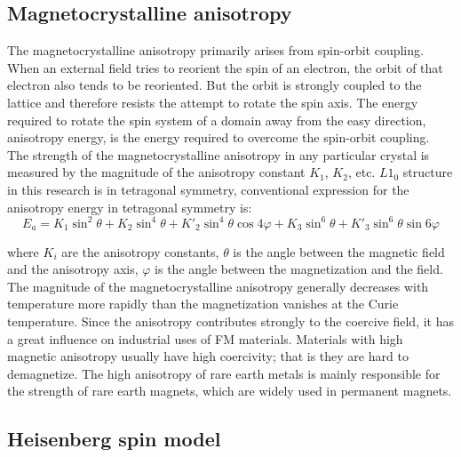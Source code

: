\subsection{Magnetocrystalline anisotropy}
The magnetocrystalline anisotropy primarily arises from spin-orbit coupling.
When an external field tries to reorient the spin of an electron, the orbit of that electron
also tends to be reoriented. But the orbit is strongly coupled to the lattice and therefore
resists the attempt to rotate the spin axis. The energy required to rotate the spin system of
a domain away from the easy direction, anisotropy energy, is the energy required to
overcome the spin-orbit coupling. The strength of the magnetocrystalline anisotropy in
any particular crystal is measured by the magnitude of the anisotropy constant $K_1$, $K_2$, etc.
$L1_0$ structure in this research is in tetragonal symmetry, conventional expression for the
anisotropy energy in tetragonal symmetry is:
\begin{equation}
E_a = K_1 \sin^2 \theta + K_2 \sin^4 \theta + K'_2 \sin^4  \theta \cos 4\varphi + K_3 \sin^6 \theta +K'_3 \sin^6 \theta \sin 6 \varphi
\end{equation}

where $K_i$ are the anisotropy constants, $\theta$
is the angle between the magnetic field and the anisotropy axis, $\varphi$ is the angle between
the magnetization and the field.
The magnitude of the magnetocrystalline anisotropy generally decreases with
temperature more rapidly than the magnetization vanishes at the Curie temperature. Since
the anisotropy contributes strongly to the coercive field, it has a great influence on
industrial uses of FM materials. Materials with high magnetic anisotropy
usually have high coercivity; that is they are hard to demagnetize.
The high anisotropy of rare earth metals is mainly responsible for the strength of rare earth magnets, which are widely used in permanent magnets.

\subsection{Heisenberg spin model}
\label{section: Heisenberg spin model}

